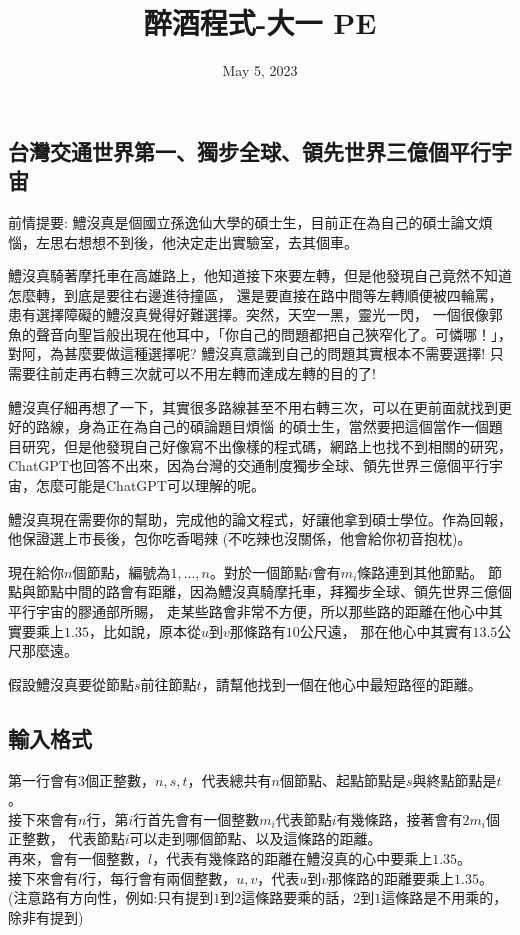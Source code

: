 \documentclass{article}
\title{醉酒程式-大一 PE}
\date{May 5, 2023}
\begin{document}
\begin{CJK*}{UTF8}{bsmi}

\maketitle

\section*{台灣交通世界第一、獨步全球、領先世界三億個平行宇宙}

前情提要: 鱧沒真是個國立孫逸仙大學的碩士生，目前正在為自己的碩士論文煩惱，左思右想想不到後，他決定走出實驗室，去其個車。

鱧沒真騎著摩托車在高雄路上，他知道接下來要左轉，但是他發現自己竟然不知道怎麼轉，到底是要往右邊進待撞區，
還是要直接在路中間等左轉順便被四輪罵，患有選擇障礙的鱧沒真覺得好難選擇。突然，天空一黑，靈光一閃，
一個很像郭魚的聲音向聖旨般出現在他耳中，「你自己的問題都把自己狹窄化了。可憐哪！」，對阿，為甚麼要做這種選擇呢? 
鱧沒真意識到自己的問題其實根本不需要選擇! 只需要往前走再右轉三次就可以不用左轉而達成左轉的目的了!

鱧沒真仔細再想了一下，其實很多路線甚至不用右轉三次，可以在更前面就找到更好的路線，身為正在為自己的碩論題目煩惱
的碩士生，當然要把這個當作一個題目研究，但是他發現自己好像寫不出像樣的程式碼，網路上也找不到相關的研究，
ChatGPT也回答不出來，因為台灣的交通制度獨步全球、領先世界三億個平行宇宙，怎麼可能是ChatGPT可以理解的呢。

鱧沒真現在需要你的幫助，完成他的論文程式，好讓他拿到碩士學位。作為回報，他保證選上市長後，包你吃香喝辣
(不吃辣也沒關係，他會給你初音抱枕)。

現在給你$n$個節點，編號為$1,...,n$。對於一個節點$i$會有$m_i$條路連到其他節點。
節點與節點中間的路會有距離，因為鱧沒真騎摩托車，拜獨步全球、領先世界三億個平行宇宙的膠通部所賜，
走某些路會非常不方便，所以那些路的距離在他心中其實要乘上$1.35$，比如說，原本從$u$到$v$那條路有$10$公尺遠，
那在他心中其實有$13.5$公尺那麼遠。

假設鱧沒真要從節點$s$前往節點$t$，請幫他找到一個在他心中最短路徑的距離。

\subsection*{輸入格式}
第一行會有$3$個正整數，$n,s,t$，代表總共有$n$個節點、起點節點是$s$與終點節點是$t$。\\
接下來會有$n$行，第$i$行首先會有一個整數$m_i$代表節點$i$有幾條路，接著會有$2m_i$個正整數，
代表節點$i$可以走到哪個節點、以及這條路的距離。\\
再來，會有一個整數，$l$，代表有幾條路的距離在鱧沒真的心中要乘上$1.35$。\\
接下來會有$l$行，每行會有兩個整數，$u,v$，代表$u$到$v$那條路的距離要乘上$1.35$。
(注意路有方向性，例如:只有提到$1$到$2$這條路要乘的話，$2$到$1$這條路是不用乘的，除非有提到)


\end{CJK*}
\end{document}
